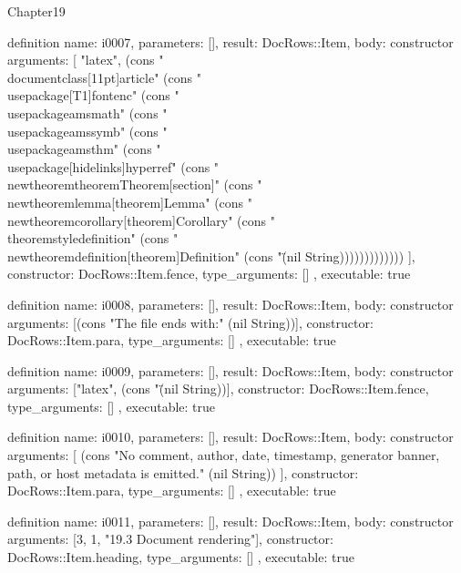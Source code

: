 \begin{lexlean}{Chapter19}
\begin{semanticmodule}
definition{
  name: i0007,
  parameters: [],
  result: DocRows::Item,
  body: constructor{
    arguments: [
      "latex",
      (cons "\\documentclass[11pt]{article}" (cons "\\usepackage[T1]{fontenc}" (cons "\\usepackage{amsmath}" (cons "\\usepackage{amssymb}" (cons "\\usepackage{amsthm}" (cons "\\usepackage[hidelinks]{hyperref}" (cons "\\newtheorem{theorem}{Theorem}[section]" (cons "\\newtheorem{lemma}[theorem]{Lemma}" (cons "\\newtheorem{corollary}[theorem]{Corollary}" (cons "\\theoremstyle{definition}" (cons "\\newtheorem{definition}[theorem]{Definition}" (cons "\" (nil String)))))))))))))
    ],
    constructor: DocRows::Item.fence,
    type_arguments: []
  },
  executable: true
}

definition{
  name: i0008,
  parameters: [],
  result: DocRows::Item,
  body: constructor{
    arguments: [(cons "The file ends with:" (nil String))],
    constructor: DocRows::Item.para,
    type_arguments: []
  },
  executable: true
}

definition{
  name: i0009,
  parameters: [],
  result: DocRows::Item,
  body: constructor{
    arguments: ["latex", (cons "\" (nil String))],
    constructor: DocRows::Item.fence,
    type_arguments: []
  },
  executable: true
}

definition{
  name: i0010,
  parameters: [],
  result: DocRows::Item,
  body: constructor{
    arguments: [
      (cons "No comment, author, date, timestamp, generator banner, path, or host metadata is emitted." (nil String))
    ],
    constructor: DocRows::Item.para,
    type_arguments: []
  },
  executable: true
}

definition{
  name: i0011,
  parameters: [],
  result: DocRows::Item,
  body: constructor{
    arguments: [3, 1, "19.3 Document rendering"],
    constructor: DocRows::Item.heading,
    type_arguments: []
  },
  executable: true
}


\end{semanticmodule}
\end{lexlean}
